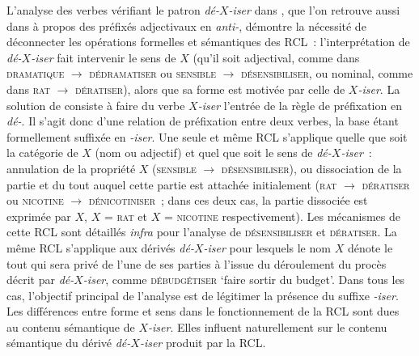 \documentclass[output=paper]{langsci/langscibook}
\begin{document}
L'analyse des verbes vérifiant le patron \emph{\mbox{dé-$X$-iser}} dans \citet{Fradin03}, que l'on retrouve aussi dans \citet{Fradin1997e} à propos des préfixés adjectivaux en \emph{\mbox{anti-}}, démontre la nécessité de déconnecter les opérations formelles et sémantiques des RCL~: l'interprétation de \emph{\mbox{dé-$X$-iser}} fait intervenir le sens de $X$ (qu'il soit adjectival,
comme dans \textsc{dramatique} $\rightarrow$ \textsc{dédramatiser} ou
\textsc{sensible} $\rightarrow$ \textsc{désensibiliser}, ou nominal, comme dans \textsc{rat} $\rightarrow$ \textsc{dératiser}), alors que sa forme est motivée par celle de \emph{\mbox{$X$-iser}}.  La solution de \citet[297]{Fradin03} consiste à faire du verbe \emph{\mbox{$X$-iser}} l'entrée de la règle de préfixation en \emph{\mbox{dé-}}.
Il s'agit donc d'une relation de préfixation entre deux verbes, la base étant formellement suffixée en \emph{\mbox{-iser}}. Une seule et même RCL  s'applique quelle que soit la catégorie de $X$ (nom ou adjectif) et quel que soit le sens de \emph{\mbox{dé-$X$-iser}}~: annulation de la propriété $X$ (\textsc{sensible} $\rightarrow$ \textsc{désensibiliser}), ou dissociation de la partie et du tout auquel cette partie est attachée initialement (\textsc{rat} $\rightarrow$ \textsc{dératiser} ou \textsc{nicotine} $\rightarrow$ \textsc{dénicotiniser}~; dans ces deux cas, la partie dissociée est exprimée par $X$, $X$ = \textsc{rat} et $X$
 = \textsc{nicotine} respectivement). Les mécanismes de cette RCL sont détaillés \emph{infra} pour l'analyse de \textsc{désensibiliser} et \textsc{dératiser}. La même RCL s'applique aux dérivés \emph{\mbox{dé-$X$-iser}} pour lesquels le nom $X$ dénote le tout qui sera privé de l'une de ses parties à l'issue du déroulement du procès décrit par \emph{\mbox{dé-$X$-iser}}, comme \textsc{débudgétiser} `faire sortir du budget'. Dans tous les cas, l'objectif principal de l'analyse est de légitimer la présence du suffixe \emph{\mbox{-iser}}. Les différences entre forme et sens dans le fonctionnement de la RCL sont dues au contenu sémantique de \emph{\mbox{$X$-iser}}.  Elles influent naturellement sur le contenu sémantique du dérivé \emph{\mbox{dé-$X$-iser}} produit par la RCL.
\end{document}
